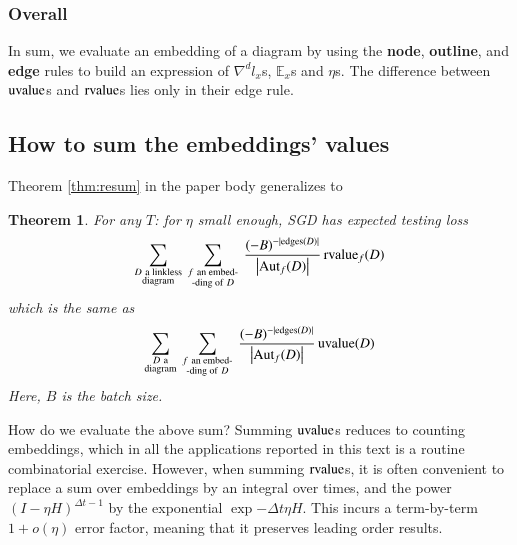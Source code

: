 \documentclass[anon,12pt]{colt2021} %
\newtheorem*{thm*}{Theorem}
\newcommand{\wrap}[1]{\left(#1\right)}
\newcommand{\wabs}[1]{\left|#1\right|}
\newcommand{\Aut}{\text{\textnormal{Aut}}}
\newcommand{\uvalue}{\text{\textnormal{uvalue}}}
\newcommand{\rvalue}{\text{\textnormal{rvalue}}}
\newcommand{\edges}{\text{\textnormal{edges}}}
\newcommand{\expc}{\mathbb{E}}
\begin{document}
        \subsubsection{Overall}
            In sum, we evaluate an embedding of a diagram by using the 
            \textbf{node}, 
            \textbf{outline}, and
            \textbf{edge}
            rules to build an expression of $\nabla^d l_x$s, $\expc_x$s and
            $\eta$s.  The difference between $\uvalue$s and $\rvalue$s lies
            only in their edge rule.

    \subsection{How to sum the embeddings' values}                  \label{appendix:sum-embeddings}
        Theorem \ref{thm:resum} in the paper body generalizes to
        \begin{thm*}
            For any $T$: for $\eta$ small enough, SGD has expected testing loss
            \begin{equation*}
                \sum_{\substack{D~\text{a linkless} \\ \text{diagram}}}
                ~
                \sum_{\substack{f~\text{an embed-} \\ \text{-ding of}~D}}
                ~
                \frac{(-B)^{-|\edges(D)|}}{\wabs{\Aut_f(D)}}
                \,
                {\rvalue_f}(D)
            \end{equation*}
            which is the same as
            \begin{equation*}
                \sum_{\substack{D~\text{a} \\ \text{diagram}}}
                ~
                \sum_{\substack{f~\text{an embed-} \\ \text{-ding of}~D}}
                ~
                \frac{(-B)^{-|\edges(D)|}}{\wabs{\Aut_f(D)}}
                \,
                {\uvalue}(D)
            \end{equation*}
            Here, $B$ is the batch size.
        \end{thm*}

        How do we evaluate the above sum?
        Summing $\uvalue$s reduces to counting embeddings, which in all the
        applications reported in this text is a routine combinatorial exercise. 
        However, when summing $\rvalue$s, it is often convenient to replace
        a sum over embeddings by an integral over times, and
        the power $\wrap{I-\eta H}^{\Delta t-1}$ by
        the exponential $\exp{-\Delta t \eta H}$.  This incurs a term-by-term
        $1+o(\eta)$ error factor, meaning that it preserves leading order
        results. 
\end{document}
